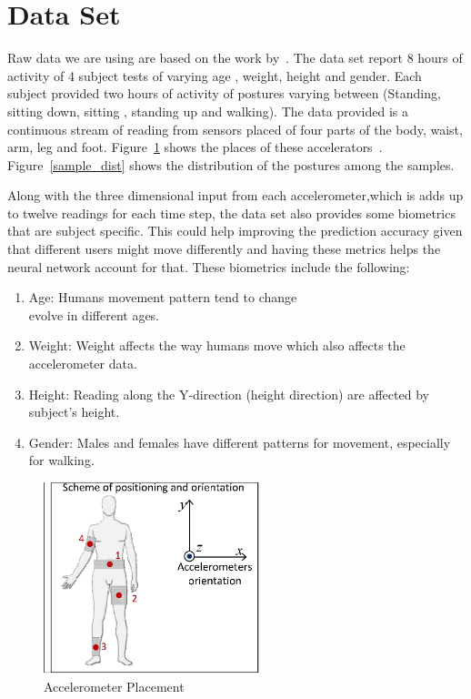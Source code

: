 \documentclass{article}
\begin{document}
\section{Data Set}
\label{DataSet}

Raw data we are using are based on the work by~\cite{ugulino2012wearable}. The data set report 8 hours of activity of 4 subject tests 
of varying age , weight, height and gender. Each subject provided two hours of activity of postures varying between (Standing,
sitting down, sitting , standing up and walking). The data provided is a continuous stream of reading from sensors placed of four 
parts of the body, waist, arm, leg and foot. Figure~\ref{acc_placement} shows the places of these accelerators~\cite{ugulino2012wearable}.
Figure~\ref{sample_dist} shows the distribution of the postures among the samples.

Along with the three dimensional input from each accelerometer,which is adds up to twelve readings for each time step, the data set 
also provides some biometrics that are subject specific. This could help improving the prediction accuracy given that different users might
move differently and having these metrics helps the neural network account for that. These biometrics include the following: 

\begin{enumerate}
  \item Age: Humans movement pattern tend to change\\evolve in different ages. 
  \item Weight: Weight affects the way humans move which also affects the accelerometer data.
  \item Height: Reading along the Y-direction (height direction) are affected by subject's height.
  \item Gender: Males and females have different patterns for movement, especially for walking. 
\end{enumerate}  


\begin{figure}
\centering
\includegraphics[width=2.5in]{acc_placement}
\caption{Accelerometer Placement}
\label{acc_placement}
\end{figure}
\end{document}
